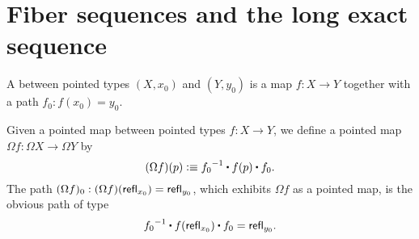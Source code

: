 \documentclass[hott-all.tex]{subfiles}
\begin{document}
\section{Fiber sequences and the long exact sequence}
% 
% 
% 
\begin{defn}
  A 
  between pointed types $(X,x_0)$ and $(Y,y_0)$ is a
  map $f:X\to Y$ together with a path $f_0:f(x_0)=y_0$.
\end{defn}
% 
% 
% 
\begin{defn}
  Given a pointed map between pointed types $f:X \to Y$, we define a pointed
  map $\Omega f:\Omega X
  \to \Omega Y$ by
  \[(\Omega f)(p) \defeq \rev{f_0}\ct\ap{f}{p}\ct f_0.\]
  The path $(\Omega f)_0 : (\Omega f) (\mathsf{refl}_{x_0}) = \mathsf{refl}_{y_0}$, which exhibits $\Omega f$ as a pointed map, is the obvious path of type
  \[\rev{f_0}\ct\ap{f}{\refl{x_0}}\ct f_0=\refl{y_0}.\]
\end{defn}
% 
% 
\end{document}
